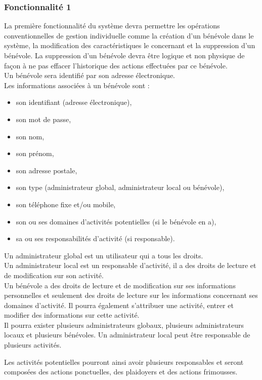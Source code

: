 \subsubsection{Fonctionnalité 1}
La première fonctionnalité du système devra permettre les opérations conventionnelles de gestion individuelle comme la création d'un bénévole dans le système, la modification des caractéristiques le concernant et la suppression d'un bénévole. La suppression d'un bénévole devra être logique et non physique de façon à ne pas effacer l'historique des actions effectuées par ce bénévole. \\
Un bénévole sera identifié par son adresse électronique.\\ 
Les informations associées à un bénévole sont :
\begin{itemize}
\item son identifiant (adresse électronique),
\item son mot de passe,
\item son nom,
\item son prénom,
\item son adresse postale,
\item son type (administrateur global, administrateur local ou bénévole),
\item son téléphone fixe et/ou mobile,
\item son ou ses domaines d'activités potentielles (si le bénévole en a),
\item sa ou ses responsabilités d'activité (si responsable).
\\
\end{itemize}

Un administrateur global est un utilisateur qui a tous les droits. \\ Un administrateur local est un responsable d'activité, il a des droits de lecture et de modification sur son activité. \\ Un bénévole a des droits de lecture et de modification sur ses informations personnelles et seulement des droits de lecture sur les informations concernant ses domaines d'activité. Il pourra également s'attribuer une activité, entrer et modifier des informations sur cette activité.\\
Il pourra exister plusieurs administrateurs globaux, plusieurs administrateurs locaux et plusieurs bénévoles. Un administrateur local peut être responsable de plusieurs activités.

Les activités potentielles pourront ainsi avoir plusieurs responsables et seront composées des actions ponctuelles, des plaidoyers et des actions frimousses. \\

